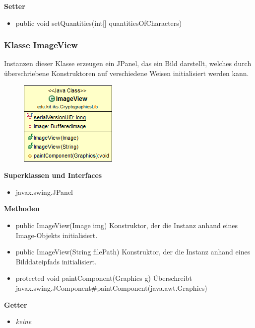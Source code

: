 \documentclass{article}
\begin{document}
      \textbf{Setter}
      \begin{itemize}
        \item public void setQuantities(int[] quantitiesOfCharacters)
      \end{itemize}
	
	\subsubsection{Klasse ImageView}
	  Instanzen dieser Klasse erzeugen ein JPanel, das ein Bild darstellt, welches
	  durch überschriebene Konstruktoren auf verschiedene Weisen initialisiert werden kann. 
	
      \begin{figure}[H]
        \centering
        \includegraphics{resources/edu-kit-iks-CryptographicsLib-ImageView}
      \end{figure}
	
      \textbf{Superklassen und Interfaces}
      \begin{itemize}
        \item javax.swing.JPanel
      \end{itemize}
	
      \textbf{Methoden}
      \begin{itemize}
        \item public ImageView(Image img) \newline
          Konstruktor, der die Instanz anhand eines Image-Objekts initialisiert.
        \item public ImageView(String filePath) \newline
          Konstruktor, der die Instanz anhand eines Bilddateipfads initialisiert.
        \item protected void paintComponent(Graphics g) \newline
          Überschreibt javax.swing.JComponent\#paintComponent(java.awt.Graphics)
      \end{itemize}
      
      \textbf{Getter}
      \begin{itemize}
		\item \textit{keine}
      \end{itemize}
      
\end{document}

